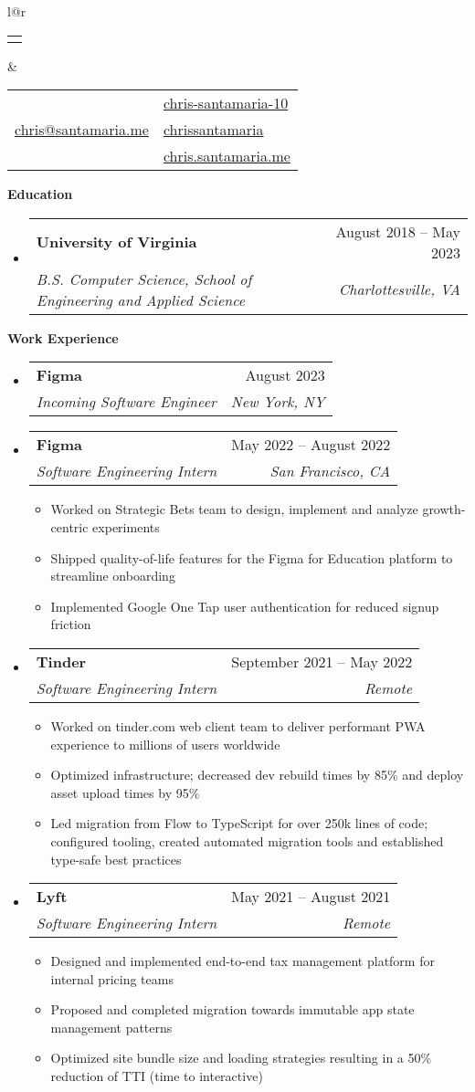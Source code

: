 \documentclass[letterpaper,12pt]{article}[leftmargin=*]
\makeatletter
\def \fullname {Chris Santamaria}
\def \linkedinicon {\faLinkedinSquare}
\def \linkedinlink {https://www.linkedin.com/in/chris-santamaria-10}
\def \linkedintext {chris-santamaria-10}
\def \phoneicon {\faPhone}
\def \phonetext {(813) 545-5164}
\def \emailicon {\faEnvelope}
\def \emaillink {mailto:chris@santamaria.me}
\def \emailtext {chris@santamaria.me}
\def \locationicon {\faMapMarker}
\def \locationtext {Saint Petersburg, FL}
\def \githubicon {\faGithub}
\def \githublink {https://github.com/chrissantamaria}
\def \githubtext {chrissantamaria}
\def \websiteicon {\faGlobe}
\def \websitelink {https://chris.santamaria.me}
\def \websitetext {chris.santamaria.me}
\def \headertype {\doublecol} %
\def \entryspacing {-0pt}
\def \linkedin {\linkedinicon \hspace{3pt}\href{\linkedinlink}{\linkedintext}}
\def \phone {\phoneicon \hspace{3pt}{ \phonetext}}
\def \email {\emailicon \hspace{4pt}\href{\emaillink}{\emailtext}}
\def \location {\hspace{0pt} \locationicon \hspace{2pt}{ \locationtext}}
\def \github {\githubicon \hspace{3pt}\href{\githublink}{\githubtext}}
\def \website {\websiteicon \hspace{3pt}\href{\websitelink}{\websitetext}}
\renewcommand{\section}[2]{\vspace{5pt}
  \colorbox{secondary}{\color{white}\raggedbottom\normalsize\textbf{{#1}{\hspace{7pt}#2}}}
}
\newcommand{\resumeEntryStart}{\begin{itemize}[leftmargin=2.5mm]}
\newcommand{\resumeEntryEnd}{\end{itemize}\vspace{\entryspacing}}
\newcommand{\resumeItemListStart}{\begin{itemize}[leftmargin=4.5mm]}
\newcommand{\resumeItemListEnd}{\end{itemize}}
\newcommand{\resumeItem}[1]{
  \item\small{
    {#1 \vspace{-2pt}}
  }
}
\newcommand{\resumeEntryTSDL}[4]{
  \vspace{-1pt}\item[]
    \begin{tabular*}{0.97\textwidth}{l@{\extracolsep{\fill}}r}
      \textbf{\color{primary}#1} & {\firabook\color{accent}\small#2} \\
      \textit{\color{accent}\small#3} & \textit{\color{accent}\small#4} \\
    \end{tabular*}\vspace{-7pt}
}
\newcommand{\doublecol}[6]{
  \begin{tabular*}{\textwidth}{l@{\extracolsep{\fill}}r}
    {
      \begin{tabular}[c]{l}
        \fontsize{35}{45}\selectfont{\color{primary}{{\textbf{\fullname}}}}
      \end{tabular}
    } & {
      \begin{tabular}[c]{l@{\hspace{1.5em}}l}
        {\small#4} & {\small#1} \\
        {\small#5} & {\small#2} \\
        {\small#6} & {\small#3}
      \end{tabular}
    }
  \end{tabular*}
}
\newcommand{\singlecol}[6]{
  \begin{tabular*}{\textwidth}{l@{\extracolsep{\fill}}r}
    {
      \begin{tabular}[b]{l}
        \fontsize{35}{45}\selectfont{\color{primary}{{\textbf{\fullname}}}} \\
        {\textit{\subtitle}} %
      \end{tabular}
    } & {
      \begin{tabular}[c]{l}
        {\small#1} \\
        {\small#2} \\
        {\small#3} \\
        {\small#4} \\
        {\small#5} \\
        {\small#6}
      \end{tabular}
    }
  \end{tabular*}
}
\makeatother
\begin{document}
\headertype
{\linkedin}
{\github}
{\website}
{\phone}
{\email}
{\location}
\vspace{0pt} %

\section{\faGraduationCap}{Education}

\resumeEntryStart
\resumeEntryTSDL
{University of Virginia}
{August 2018 -- May 2023}
{B.S. Computer Science, School of Engineering and Applied Science}{Charlottesville, VA}
\resumeEntryEnd

\section{\faCode}{Work Experience}

\resumeEntryStart
\resumeEntryTSDL
{Figma}
{August 2023}
{Incoming Software Engineer}
{New York, NY}
\resumeEntryEnd

\resumeEntryStart
\resumeEntryTSDL
{Figma}
{May 2022 -- August 2022}
{Software Engineering Intern}
{San Francisco, CA}
\resumeItemListStart
\resumeItem {Worked on Strategic Bets team to design, implement and analyze growth-centric experiments}
\resumeItem {Shipped quality-of-life features for the Figma for Education platform to streamline onboarding}
\resumeItem {Implemented Google One Tap user authentication for reduced signup friction}
\resumeItemListEnd
\resumeEntryEnd

\resumeEntryStart
\resumeEntryTSDL
{Tinder}
{September 2021 -- May 2022}
{Software Engineering Intern}
{Remote}
\resumeItemListStart
\resumeItem {Worked on tinder.com web client team to deliver performant PWA experience to millions of users worldwide}
\resumeItem {Optimized infrastructure; decreased dev rebuild times by 85\% and deploy asset upload times by 95\%}
\resumeItem {Led migration from Flow to TypeScript for over 250k lines of code; configured tooling, created automated migration tools and established type-safe best practices}
\resumeItemListEnd
\resumeEntryEnd

\resumeEntryStart
\resumeEntryTSDL
{Lyft}
{May 2021 -- August 2021}
{Software Engineering Intern}
{Remote}
\resumeItemListStart
\resumeItem {Designed and implemented end-to-end tax management platform for internal pricing teams}
\resumeItem {Proposed and completed migration towards immutable app state management patterns}
\resumeItem {Optimized site bundle size and loading strategies resulting in a 50\% reduction of TTI (time to interactive)}
\resumeItemListEnd
\resumeEntryEnd
\end{document}
